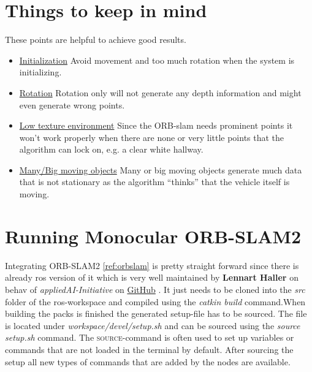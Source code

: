 \section{Things to keep in mind}\label{ref:orbslamgetgoodresults}
These points are helpful to achieve good results.
\begin{itemize}
    \item \underline{Initialization} \newline
    Avoid movement and too much rotation when the system is initializing.
    
    \item \underline{Rotation} \newline
    Rotation only will not generate any depth information and might even generate wrong points.
    
    \item \underline{Low texture environment} \newline
    Since the ORB-\gls{slam} needs prominent points it won't work properly when there are none or very little points that the algorithm can lock on, e.g. a clear white hallway.
    
    \item \underline{Many/Big moving objects} \newline
    Many or big moving objects generate much data that is not stationary as the algorithm \enquote{thinks} that the vehicle itself is moving.
    
\end{itemize}



\section{Running Monocular ORB-SLAM2\authorA}\label{ref:runningmonocularorbslam}
Integrating ORB-SLAM2 \ref{ref:orbslam} is pretty straight forward since there is already \gls{ros} version of it which is very well maintained by \textbf{Lennart Haller} on behav of \textit{appliedAI-Initiative} on \href{https://github.com/appliedAI-Initiative/orb_slam_2_ros}{GitHub} \cite{orbslam2rosgithub}. It just needs to be cloned into the \textit{src} folder of the \gls{ros}-workspace and compiled using the \textit{catkin build} command.When building the packs is finished the generated setup-file has to be sourced. The file is located under \textit{workspace/devel/setup.sh} and can be sourced using the \textit{source setup.sh} command. The \textsc{source}-command is often used to set up variables or commands that are not loaded in the terminal by default. After sourcing the setup all new types of commands that are added by the nodes are available.

